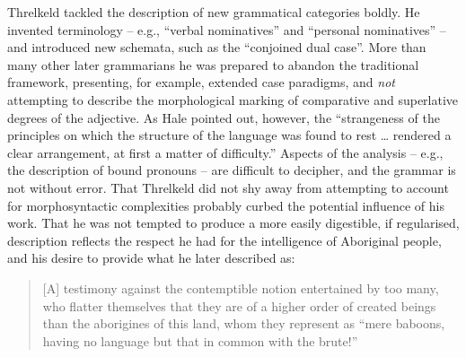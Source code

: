 Threlkeld tackled the description of new grammatical categories boldly. He invented terminology -- e.g., “verbal nominatives” and “personal nominatives'' -- and introduced new schemata, such as the “conjoined dual case''. More than many other later grammarians he was prepared to abandon the traditional framework, presenting, for example, extended case paradigms, and \textit{not} attempting to describe the morphological marking of comparative and superlative degrees of the adjective. As Hale \citep[482]{roth_ethnological_1897} pointed out, however, the “strangeness of the principles on which the structure of the language was found to rest … rendered a clear arrangement, at first a matter of difficulty.” Aspects of the analysis -- e.g., the description of bound pronouns -- are difficult to decipher, and the grammar is not without error. That Threlkeld did not shy away from attempting to account for morphosyntactic complexities probably curbed the potential influence of his work. That he was not tempted to produce a more easily digestible, if regularised, description reflects the respect he had for the intelligence of Aboriginal people, and his desire to provide what he later described as: 
\begin{quote}
    [A] testimony against the contemptible notion entertained by too many, who flatter themselves that they are of a higher order of created beings than the aborigines of this land, whom they represent as ``mere baboons, having no language but that in common with the brute!'' \citep[4]{threlkeld_key_1850}
\end{quote}
